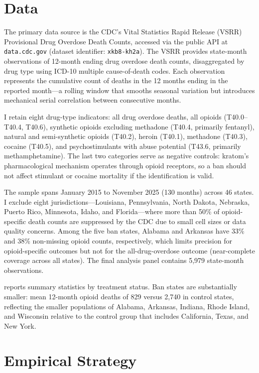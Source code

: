 \documentclass[12pt]{article}
\begin{document}
\section{Data}

The primary data source is the CDC's Vital Statistics Rapid Release (VSRR) Provisional Drug Overdose Death Counts, accessed via the public API at \texttt{data.cdc.gov} (dataset identifier: \texttt{xkb8-kh2a}). The VSRR provides state-month observations of 12-month ending drug overdose death counts, disaggregated by drug type using ICD-10 multiple cause-of-death codes. Each observation represents the cumulative count of deaths in the 12 months ending in the reported month---a rolling window that smooths seasonal variation but introduces mechanical serial correlation between consecutive months.

I retain eight drug-type indicators: all drug overdose deaths, all opioids (T40.0--T40.4, T40.6), synthetic opioids excluding methadone (T40.4, primarily fentanyl), natural and semi-synthetic opioids (T40.2), heroin (T40.1), methadone (T40.3), cocaine (T40.5), and psychostimulants with abuse potential (T43.6, primarily methamphetamine). The last two categories serve as negative controls: kratom's pharmacological mechanism operates through opioid receptors, so a ban should not affect stimulant or cocaine mortality if the identification is valid.

The sample spans January 2015 to November 2025 (130 months) across 46 states. I exclude eight jurisdictions---Louisiana, Pennsylvania, North Dakota, Nebraska, Puerto Rico, Minnesota, Idaho, and Florida---where more than 50\% of opioid-specific death counts are suppressed by the CDC due to small cell sizes or data quality concerns. Among the five ban states, Alabama and Arkansas have 33\% and 38\% non-missing opioid counts, respectively, which limits precision for opioid-specific outcomes but not for the all-drug-overdose outcome (near-complete coverage across all states). The final analysis panel contains 5,979 state-month observations.



 reports summary statistics by treatment status. Ban states are substantially smaller: mean 12-month opioid deaths of 829 versus 2,740 in control states, reflecting the smaller populations of Alabama, Arkansas, Indiana, Rhode Island, and Wisconsin relative to the control group that includes California, Texas, and New York.


\section{Empirical Strategy}
\end{document}
